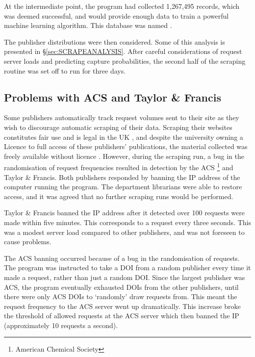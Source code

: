 At the intermediate point, the program had collected 1,267,495 records, which was deemed successful, and would provide enough data to train a powerful machine learning algorithm. This database was named .

The publisher distributions were then considered. Some of this analysis is presented in \S\ref{sec:SCRAPEANALYSIS}. After careful considerations of request server loads and predicting capture probabilities, the second half of the scraping routine was set off to run for three days.
\label{sec:CROSSREFSCRAPE}
\subsection{Problems with ACS and Taylor \& Francis}
Some publishers automatically track request volumes sent to their site as they wish to discourage automatic scraping of their data. Scraping their websites constitutes fair use and is legal in the UK , and despite the university owning a Licence to full access of these publishers' publications, the material collected was freely available without licence\cite{thelaw} \cite{contentminelegal}. However, during the scraping run, a bug in the randomisation of request frequencies resulted in detection by the ACS \footnote{American Chemical Society} and Taylor \& Francis. Both publishers responded by banning the IP address of the computer running the program. The department librarians were able to restore access, and it was agreed that no further scraping runs would be performed. 

Taylor \& Francis banned the IP address after it detected over 100 requests were made within five minutes. This corresponds to a request every three seconds. This was a modest server load compared to other publishers, and was not foreseen to cause problems.

The ACS banning occurred because of a bug in the randomisation of requests. The program was instructed to take a DOI from a random publisher every time it made a request, rather than just a random DOI. Since the largest publisher was ACS, the program eventually exhausted DOIs from the other publishers, until there were only ACS DOIs to `randomly' draw requests from. This meant the request frequency to the ACS server went up dramatically. This increase broke the threshold of allowed requests at the ACS server which then banned the IP (approximately 10 requests a second).

